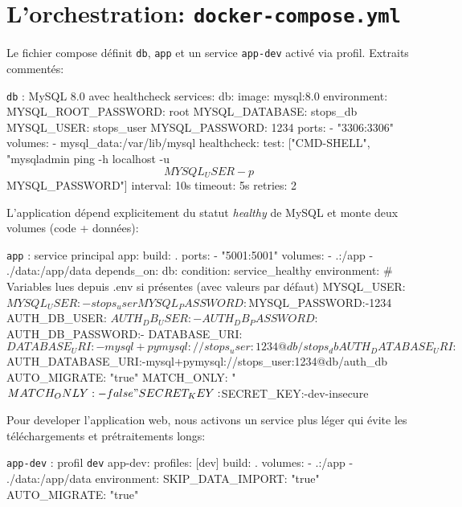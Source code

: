 \section{L'orchestration: \texttt{docker-compose.yml}}

Le fichier compose définit \texttt{db}, \texttt{app} et un service \texttt{app-dev} activé via profil. Extraits commentés:

\begin{codebox}{\texttt{db} : MySQL 8.0 avec healthcheck}
services:
  db:
    image: mysql:8.0
    environment:
      MYSQL_ROOT_PASSWORD: root
      MYSQL_DATABASE: stops_db
      MYSQL_USER: stops_user
      MYSQL_PASSWORD: 1234
    ports:
      - "3306:3306"
    volumes:
      - mysql_data:/var/lib/mysql
    healthcheck:
      test: ["CMD-SHELL", "mysqladmin ping -h localhost -u$${MYSQL_USER} -p$${MYSQL_PASSWORD}"]
      interval: 10s
      timeout: 5s
      retries: 2
\end{codebox}

\noindent L'application dépend explicitement du statut \textit{healthy} de MySQL et monte deux volumes (code + données):

\begin{codebox}{\texttt{app} : service principal}
  app:
    build: .
    ports:
      - "5001:5001"
    volumes:
      - .:/app
      - ./data:/app/data
    depends_on:
      db:
        condition: service_healthy
    environment:
      # Variables lues depuis .env si présentes (avec valeurs par défaut)
      MYSQL_USER: ${MYSQL_USER:-stops_user}
      MYSQL_PASSWORD: ${MYSQL_PASSWORD:-1234}
      AUTH_DB_USER: ${AUTH_DB_USER:-}
      AUTH_DB_PASSWORD: ${AUTH_DB_PASSWORD:-}
      DATABASE_URI: ${DATABASE_URI:-mysql+pymysql://stops_user:1234@db/stops_db}
      AUTH_DATABASE_URI: ${AUTH_DATABASE_URI:-mysql+pymysql://stops_user:1234@db/auth_db}
      AUTO_MIGRATE: "true"
      MATCH_ONLY: "${MATCH_ONLY:-false}"
      SECRET_KEY: ${SECRET_KEY:-dev-insecure}
\end{codebox}

\noindent Pour developer l'application web, nous activons un service plus léger qui évite les téléchargements et prétraitements longs:

\begin{codebox}{\texttt{app-dev} : profil \texttt{dev}}
  app-dev:
    profiles: [dev]
    build: .
    volumes:
      - .:/app
      - ./data:/app/data
    environment:
      SKIP_DATA_IMPORT: "true"
      AUTO_MIGRATE: "true"
\end{codebox}

